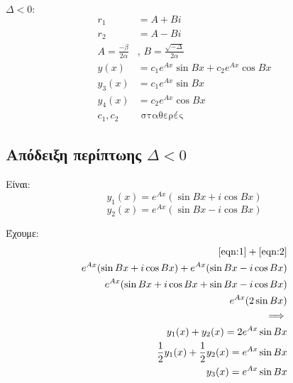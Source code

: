 \documentclass[]{extarticle}
\begin{document}
\begin{multicols*}{2}
\begin{enumerate}
\begin{math}
                  \Delta   < 0 :
              \end{math}
              \begin{equation*}
                  \begin{aligned}
                      r_1                      & = A + Bi                                    \\
                      r_2                      & = A - Bi                                    \\
                      A        = \frac{-β}{2α} & \text{, } B = \frac{\sqrt{-Δ}}{2α}          \\
                      y(x)                     & = c_1 e^{Ax} \sin{Bx} + c_2 e^{Ax} \cos{Bx} \\
                      y_3(x)                   & = c_1 e^{Ax} \sin{Bx}                       \\
                      y_4(x)                   & = c_2 e^{Ax} \cos{Bx}                       \\
                      c_1, c_2                 & \text{ σταθερές}
                  \end{aligned}
              \end{equation*}
    \end{enumerate}
    \subsection{Απόδειξη περίπτωης \(Δ<0\)}
    Είναι:
    \begin{equation}\label{eqn:1}
        y_1(x) = e^{Ax} (\sin{Bx} + i \cos{Bx})
    \end{equation}
    \begin{equation}\label{eqn:2}
        y_2(x) = e^{Ax} (\sin{Bx} - i \cos{Bx})
    \end{equation}

    Έχουμε:
    \begin{equation*}
        \begin{aligned}
            \eqref{eqn:1} + \eqref{eqn:2}                                   \\
            e^{Ax} (\sin{Bx} + i \cos{Bx}) + e^{Ax} (\sin{Bx} - i \cos{Bx}) \\
            e^{Ax} (\sin{Bx} + i \cos{Bx} + \sin{Bx} - i \cos{Bx})          \\
            e^{Ax} (2 \sin{Bx})                                             \\
            \implies                                                        \\
            y_1(x) + y_2(x)                         = 2 e^{Ax} \sin{Bx}     \\
            \frac{1}{2} y_1(x) + \frac{1}{2} y_2(x) = e^{Ax} \sin{Bx}       \\
            y_3(x)                                  = e^{Ax} \sin{Bx}
        \end{aligned}
    \end{equation*}



\end{multicols*}
\end{document}
